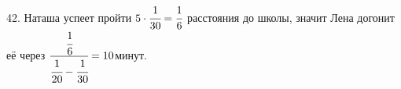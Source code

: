 42. Наташа успеет пройти $5\cdot\cfrac{1}{30}=\cfrac{1}{6}$ расстояния до школы, значит Лена догонит её через $\cfrac{\cfrac{1}{6}}{\cfrac{1}{20}-\cfrac{1}{30}}=10$минут.\\
